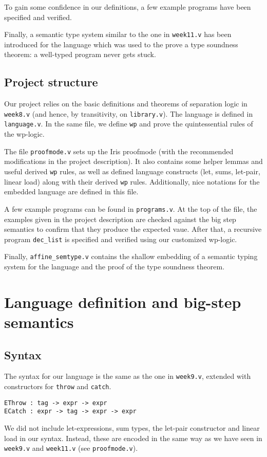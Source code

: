 \documentclass{article}
\begin{document}
To gain some confidence in our definitions, a few example programs have been specified and verified.

Finally, a semantic type system similar to the one in \texttt{week11.v} has been introduced for the language which was used to the
prove a type soundness theorem: a well-typed program never gets stuck.

\subsection{Project structure}

Our project relies on the basic definitions and theorems of separation logic in \texttt{week8.v} (and hence, by transitivity, on \texttt{library.v}).
The language is defined in \texttt{language.v}. In the same file, we define \texttt{wp} and prove the quintessential rules of the wp-logic.

The file \texttt{proofmode.v} sets up the Iris proofmode (with the recommended modifications in the project description). It also contains some
helper lemmas and useful derived \texttt{wp} rules, as well as defined language constructs (let, sums, let-pair, linear load)
along with their derived \texttt{wp} rules. Additionally, nice notations for the embedded language are defined in this file.

A few example programs can be found in \texttt{programs.v}.  At the top of the file, the examples given in the project description
are checked against the big step semantics to confirm that they produce the expected vaue. After that, a recursive program \texttt{dec\_list} is
specified and verified using our customized wp-logic.

Finally, \texttt{affine\_semtype.v} contains the shallow embedding of a semantic typing system for the language and the proof of the type soundness theorem.

\section{Language definition and big-step semantics}

\subsection{Syntax}

The syntax for our language is the same as the one in \texttt{week9.v}, extended with constructors for \texttt{throw} and \texttt{catch}.
\begin{lstlisting}
EThrow : tag -> expr -> expr
ECatch : expr -> tag -> expr -> expr
\end{lstlisting}
We did not include let-expressions, sum types, the let-pair constructor and linear load in our syntax. Instead, these are encoded in the same way as we have
seen in \texttt{week9.v} and \texttt{week11.v} (see \texttt{proofmode.v}).
\end{document}
